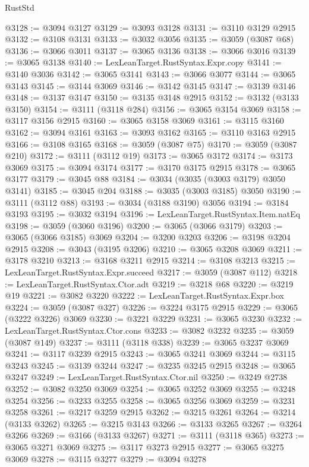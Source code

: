 \begin{lexlean}{RustStd}
\begin{coremodule}
@3128 := @3094 @3127
@3129 := @3093 @3128
@3131 := @3110 @3129 @2915
@3132 := @3108 @3131
@3133 := @3032 @3056
@3135 := @3059 (@3087 @68)
@3136 := @3066 @3011
@3137 := @3065 @3136
@3138 := @3066 @3016
@3139 := @3065 @3138
@3140 := LexLeanTarget.RustSyntax.Expr.copy
@3141 := @3140 @3036
@3142 := @3065 @3141
@3143 := @3066 @3077
@3144 := @3065 @3143
@3145 := @3144 @3069
@3146 := @3142 @3145
@3147 := @3139 @3146
@3148 := @3137 @3147
@3150 := @3135 @3148 @2915
@3152 := @3132 (@3133 @3150)
@3154 := @3111 (@3118 @284)
@3156 := @3065 @3154 @3069
@3158 := @3117 @3156 @2915
@3160 := @3065 @3158 @3069
@3161 := @3115 @3160
@3162 := @3094 @3161
@3163 := @3093 @3162
@3165 := @3110 @3163 @2915
@3166 := @3108 @3165
@3168 := @3059 (@3087 @75)
@3170 := @3059 (@3087 @210)
@3172 := @3111 (@3112 @19)
@3173 := @3065 @3172
@3174 := @3173 @3069
@3175 := @3094 @3174
@3177 := @3170 @3175 @2915
@3178 := @3065 @3177
@3179 := @3045 @88
@3184 := @3034 (@3035 (@3003 @3179) @3050 @3141)
@3185 := @3045 @204
@3188 := @3035 (@3003 @3185) @3050
@3190 := @3111 (@3112 @88)
@3193 := @3034 (@3188 @3190) @3056
@3194 := @3184 @3193
@3195 := @3032 @3194
@3196 := LexLeanTarget.RustSyntax.Item.natEq
@3198 := @3059 (@3060 @3196)
@3200 := @3065 (@3066 @3179)
@3203 := @3065 (@3066 @3185) @3069
@3204 := @3200 @3203
@3206 := @3198 @3204 @2915
@3208 := @3043 (@3195 @3206)
@3210 := @3065 @3208 @3069
@3211 := @3178 @3210
@3213 := @3168 @3211 @2915
@3214 := @3108 @3213
@3215 := LexLeanTarget.RustSyntax.Expr.succeed
@3217 := @3059 (@3087 @112)
@3218 := LexLeanTarget.RustSyntax.Ctor.adt
@3219 := @3218 @68
@3220 := @3219 @19
@3221 := @3082 @3220
@3222 := LexLeanTarget.RustSyntax.Expr.box
@3224 := @3059 (@3087 @327)
@3226 := @3224 @3175 @2915
@3229 := @3065 (@3222 @3226) @3069
@3230 := @3221 @3229
@3231 := @3065 @3230
@3232 := LexLeanTarget.RustSyntax.Ctor.cons
@3233 := @3082 @3232
@3235 := @3059 (@3087 @149)
@3237 := @3111 (@3118 @338)
@3239 := @3065 @3237 @3069
@3241 := @3117 @3239 @2915
@3243 := @3065 @3241 @3069
@3244 := @3115 @3243
@3245 := @3139 @3244
@3247 := @3235 @3245 @2915
@3248 := @3065 @3247
@3249 := LexLeanTarget.RustSyntax.Ctor.nil
@3250 := @3249 @2738
@3252 := @3082 @3250 @3069
@3254 := @3065 @3252 @3069
@3255 := @3248 @3254
@3256 := @3233 @3255
@3258 := @3065 @3256 @3069
@3259 := @3231 @3258
@3261 := @3217 @3259 @2915
@3262 := @3215 @3261
@3264 := @3214 (@3133 @3262)
@3265 := @3215 @3143
@3266 := @3133 @3265
@3267 := @3264 @3266
@3269 := @3166 (@3133 @3267)
@3271 := @3111 (@3118 @365)
@3273 := @3065 @3271 @3069
@3275 := @3117 @3273 @2915
@3277 := @3065 @3275 @3069
@3278 := @3115 @3277
@3279 := @3094 @3278

\end{coremodule}
\end{lexlean}
